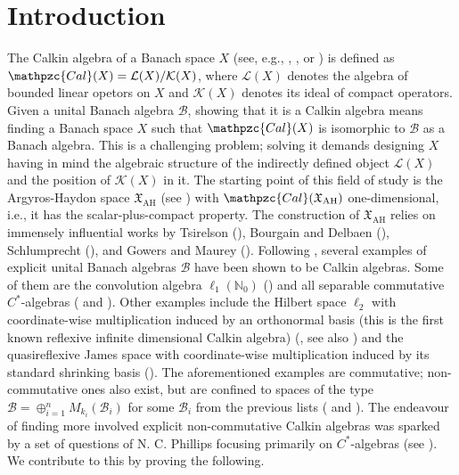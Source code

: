 \documentclass[11pt]{amsart}
\theoremstyle{definition}
\newcommand{\N}{\mathbb{N}}
\numberwithin{equation}{section}
\begin{document}
\tableofcontents


\section{Introduction}





The Calkin algebra of a Banach space $X$ (see, e.g., \cite{calkin:1941}, \cite{yood:1954}, or \cite{caradus:pfaffenberger:yood:1974}) is defined as $\mathpzc{Cal}(X) = \mathcal{L}(X)/\mathcal{K}(X)$, where $\mathcal{L}(X)$ denotes the algebra of bounded linear opetors on $X$ and $\mathcal{K}(X)$ denotes its ideal of compact operators. Given a unital Banach algebra $\mathcal{B}$, showing that it is a Calkin algebra means finding a Banach space $X$ such that $\mathpzc{Cal}(X)$ is isomorphic to $\mathcal{B}$ as a Banach algebra. This is a challenging problem; solving it demands designing $X$ having in mind the algebraic structure of the indirectly defined object $\mathcal{L}(X)$ and the position of $\mathcal{K}(X)$ in it. The starting point of this field of study is the Argyros-Haydon space $\mathfrak{X}_\mathrm{AH}$ (see \cite{argyros:haydon:2011}) with $\mathpzc{Cal}(\mathfrak{X}_\mathrm{AH})$ one-dimensional, i.e., it has the scalar-plus-compact property. The construction of $\mathfrak{X}_\mathrm{AH}$ relies on immensely influential works by Tsirelson (\cite{tsirelson:1974}), Bourgain and Delbaen (\cite{bourgain:delbaen:1980}), Schlumprecht (\cite{schlumprecht:1991}), and Gowers and Maurey (\cite{gowers:maurey:1993}). Following \cite{argyros:haydon:2011}, several examples of explicit unital Banach algebras $\mathcal{B}$ have been shown to be Calkin algebras. Some of them are the convolution algebra $\ell_1(\N_0)$ (\cite{tarbard:2013}) and all separable commutative $C^*$-algebras (\cite{motakis:puglisi:zisimopoulou:2016} and \cite{motakis:2024}). Other examples include the Hilbert space $\ell_2$ with coordinate-wise multiplication induced by an orthonormal basis (this is the first known reflexive infinite dimensional Calkin algebra) (\cite{motakis:pelczar:2024}, see also \cite{pelczar-barwacz:2023}) and the quasireflexive James space with coordinate-wise multiplication induced by its standard shrinking basis (\cite{motakis:puglisi:tolias:2020}). The aforementioned examples are commutative; non-commutative ones also exist, but are confined to spaces of the type $\mathcal{B} = \oplus_{i=1}^n M_{k_i}(\mathcal{B}_i)$ for some $\mathcal{B}_i$ from the previous lists (\cite[Page 1022, Note added in proof]{kania:laustsen:2017} and \cite[Corollary 8.8]{motakis:2024}). The endeavour of finding more involved explicit non-commutative Calkin algebras was sparked by a set of questions of N. C. Phillips focusing primarily on $C^*$-algebras (see \cite[Section 9]{motakis:2024}). We contribute to this by proving the following.
\end{document}
